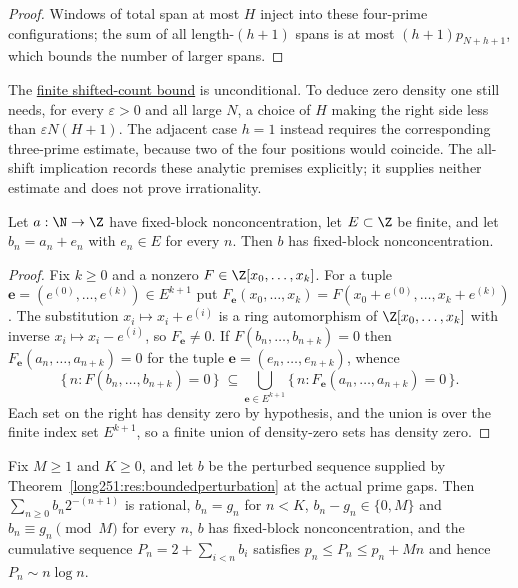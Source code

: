 \begin{proof}
Windows of total span at most $H$ inject into these four-prime
configurations; the sum of all length-$(h+1)$ spans is at most
$(h+1)p_{N+h+1}$, which bounds the number of larger spans.
\end{proof}

The \href{https://github.com/wcook04/plectis-erdos/blob/d058b9150218ae23d2cfd975580088d6167e9da8/ErdosProblems/Erdos251/ShiftedGapCountingR9.lean#L152}{finite shifted-count bound} is unconditional.
To deduce zero density one still needs, for every $\varepsilon>0$ and all
large $N$, a choice of $H$ making the right side less than
$\varepsilon N(H+1)$. The adjacent case $h=1$ instead requires the
corresponding three-prime estimate, because two of the four positions would
coincide. The all-shift implication records these analytic premises explicitly;
it supplies neither estimate and does not prove irrationality.

\begin{theorem}\label{long251:res:nonconcentration}
Let $a:\N\to\Z$ have fixed-block nonconcentration, let $E\subset\Z$ be finite,
and let $b_n=a_n+e_n$ with $e_n\in E$ for every $n$.  Then $b$ has fixed-block
nonconcentration.
\end{theorem}

\begin{proof}
Fix $k\ge0$ and a nonzero $F\in\Z[x_0,\ldots,x_k]$.  For a tuple
$\mathbf e=(e^{(0)},\ldots,e^{(k)})\in E^{k+1}$ put
$F_{\mathbf e}(x_0,\ldots,x_k)=F(x_0+e^{(0)},\ldots,x_k+e^{(k)})$.  The
substitution $x_i\mapsto x_i+e^{(i)}$ is a ring automorphism of
$\Z[x_0,\ldots,x_k]$ with inverse $x_i\mapsto x_i-e^{(i)}$, so
$F_{\mathbf e}\ne0$.  If $F(b_n,\ldots,b_{n+k})=0$ then
$F_{\mathbf e}(a_n,\ldots,a_{n+k})=0$ for the tuple
$\mathbf e=(e_n,\ldots,e_{n+k})$, whence
\[
 \{\,n:F(b_n,\ldots,b_{n+k})=0\,\}
 \;\subseteq\!\!
 \bigcup_{\mathbf e\in E^{k+1}}\!\!
 \{\,n:F_{\mathbf e}(a_n,\ldots,a_{n+k})=0\,\}.
\]
Each set on the right has density zero by hypothesis, and the union is over
the finite index set $E^{k+1}$, so a finite union of density-zero sets has
density zero.
\end{proof}

\begin{corollary}\label{long251:res:nonconc-primes}
Fix $M\ge1$ and $K\ge0$, and let $b$ be the perturbed sequence supplied by
Theorem~\ref{long251:res:boundedperturbation} at the actual prime gaps.  Then
$\sum_{n\ge0}b_n2^{-(n+1)}$ is rational, $b_n=g_n$ for $n<K$,
$b_n-g_n\in\{0,M\}$ and $b_n\equiv g_n\pmod M$ for every $n$, $b$ has
fixed-block nonconcentration, and the cumulative sequence
$P_n=2+\sum_{i<n}b_i$ satisfies $p_n\le P_n\le p_n+Mn$ and hence
$P_n\sim n\log n$.
\end{corollary}

